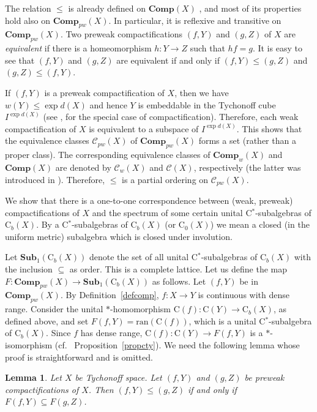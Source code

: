\documentclass[manuscript]{amsart}
\newtheorem{lemma}[theorem]{Lemma}
\theoremstyle{definition}
\begin{document}
The relation $\leq$ is already  defined on $\mathbf{Comp}(X)$
 \cite{en89, ke75}, and most of its properties hold also on
$\mathbf{Comp}_{pw}(X)$. In particular, it is reflexive and transitive
on $\mathbf{Comp}_{pw}(X)$.
Two preweak compactifications $(f,Y)$ and $(g,Z)$ of $X$
are  \textit{equivalent} if there is a homeomorphism
$h:Y\to Z$ such that $hf=g$.
It is easy to see that  $(f,Y)$ and $(g,Z)$ are equivalent if and only if
 $(f,Y)\leq (g,Z)$ and $ (g,Z)\leq (f,Y)$.

If $(f,Y)$ is a preweak compactification of $X$, then
we have $w(Y)\leq \exp d(X)$ and hence $Y$ is embeddable
in the Tychonoff cube $I^{\exp d(X)}$ (see
 \cite[Theorem~3.5.3]{en89},  for the special case of compactification).
 Therefore, each weak compactification of $X$ is equivalent to a subspace
 of $I^{\exp d(X)}$. This shows that the equivalence classes  $\mathcal{C}_{pw}(X)$ of
 $\mathbf{Comp}_{pw}(X)$
  forms
 a set (rather than a proper class).
 The corresponding  equivalence classes of
 $\mathbf{Comp}_{w}(X)$ and $\mathbf{Comp}(X)$ are denoted
 by $\mathcal{C}_{w}(X)$ and $\mathcal{C}(X)$, respectively (the latter
 was introduced in \cite[Section~3.5]{en89}).
 Therefore, $\leq$ is a partial ordering
 on $\mathcal{C}_{pw}(X)$.

We   show that  there is a one-to-one correspondence  between (weak, preweak)
compactifications of $X$ and the spectrum of some certain  unital
C$^{*}$-subalgebras of $\mathrm{C}_{b}(X)$. By a C$^{*}$-subalgebras of $\mathrm{C}_{b}(X)$
(or $\mathrm{C}_{0}(X)$)
we mean a closed (in the uniform metric) subalgebra which is closed under involution.

Let $ \mathbf{Sub}_{1}(\mathrm{C}_{b}(X))$ denote the set of
all unital C$^{*}$-subalgebras of $\mathrm{C}_{b}(X)$ with the inclusion  $\subseteq$ as order. This is a complete lattice.
Let us define the map
$F : \mathbf{Comp}_{pw}(X)\to \mathbf{Sub}_{1}(\mathrm{C}_{b}(X))$ as follows.
Let $(f,Y)$ be in
$\mathbf{Comp}_{pw}(X)$.
By Definition~\ref{defcomp}, $f:X\to Y$ is continuous
with dense range. Consider the unital $*$-homomorphism
$\mathrm{C}(f):\mathrm{C}(Y)\to \mathrm{C}_{b}(X)$, as defined above, and set
$F(f,Y)=\mathrm{ran}(\mathrm{C}(f))$, which is a unital C$^{*}$-subalgebra of $\mathrm{C}_{b}(X)$.
Since $f$ has dense range,
$\mathrm{C}(f):\mathrm{C}(Y)\to F(f,Y)$ is a $*$-isomorphism
(cf.~ Proposition~\ref{propcty}). We need the following lemma whose proof is straightforward and is omitted. 

\begin{lemma}\label{lemord}
 Let  $X$ be Tychonoff space. Let $(f,Y)$ and $(g,Z)$ be  preweak compactifications of
 $X$.
 Then $(f,Y)\leq (g,Z)$ if and only if
 $F(f,Y)\subseteq F(g,Z)$.
 \end{lemma}
\end{document}
